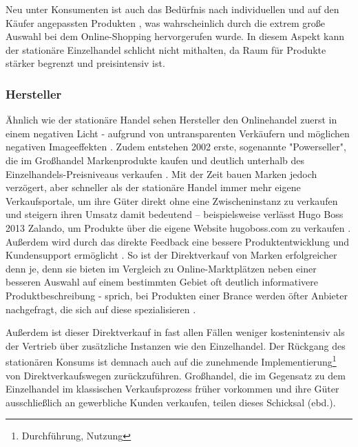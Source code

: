 \begin{folding}
Neu unter Konsumenten ist auch das Bedürfnis nach individuellen und auf den Käufer angepassten Produkten \cite[S. 43]{Nitt}, was wahrscheinlich durch die extrem große Auswahl bei dem Online-Shopping hervorgerufen wurde. In diesem Aspekt kann der stationäre Einzelhandel schlicht nicht mithalten, da Raum für Produkte stärker begrenzt und preisintensiv ist.

\end{folding}

\begin{folding} \subsubsection{Hersteller}

Ähnlich wie der stationäre Handel sehen Hersteller den Onlinehandel zuerst in einem negativen Licht - aufgrund von untransparenten Verkäufern und möglichen negativen Imageeffekten \cite[S. 20]{Graf}. Zudem entstehen 2002 erste, sogenannte "Powerseller", die im Großhandel Markenprodukte kaufen und deutlich unterhalb des Einzelhandels-Preisniveaus verkaufen \cite[S. 26]{Graf}. Mit der Zeit bauen Marken jedoch verzögert, aber schneller als der stationäre Handel immer mehr eigene Verkaufsportale, um ihre Güter direkt ohne eine Zwischeninstanz zu verkaufen und steigern ihren Umsatz damit bedeutend – beispielsweise verlässt Hugo Boss 2013 Zalando, um Produkte über die eigene Website hugoboss.com zu verkaufen \cite[S. 48f]{Graf}. Außerdem wird durch das direkte Feedback eine bessere Produktentwicklung und Kundensupport ermöglicht \cite[S. 39]{Graf}. So ist der Direktverkauf von Marken erfolgreicher denn je, denn sie bieten im Vergleich zu Online-Marktplätzen neben einer besseren Auswahl auf einem bestimmten Gebiet oft deutlich informativere Produktbeschreibung - sprich, bei Produkten einer Brance werden öfter Anbieter nachgefragt, die sich auf diese spezialisieren \cite[S. 18f]{evilcom}.

Außerdem ist dieser Direktverkauf in fast allen Fällen weniger kostenintensiv als der Vertrieb über zusätzliche Instanzen wie den Einzelhandel. Der Rückgang des stationären Konsums ist demnach auch auf die zunehmende Implementierung\footnote{Durchführung, Nutzung} von Direktverkaufswegen zurückzuführen. Großhandel, die im Gegensatz zu dem Einzelhandel im klassischen Verkaufsprozess früher vorkommen und ihre Güter ausschließlich an gewerbliche Kunden verkaufen, teilen dieses Schicksal (ebd.).

\end{folding}

